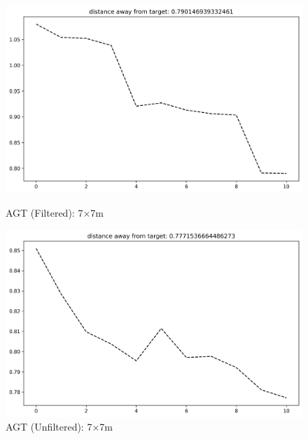 \documentclass[runningheads]{llncs}
\begin{document}
\begin{figure}[H]
	\centering
	\begin{minipage}{0.49\textwidth}
		\centering
		\includegraphics[width=\textwidth]{figures/filtered/svm_custom_7.png}
		\caption*{AGT (Filtered): 7×7m}
	\end{minipage}
	\hfill
	\begin{minipage}{0.49\textwidth}
		\centering
		\includegraphics[width=\textwidth]{figures/unfiltered/svm_custom_7.png}
		\caption*{AGT (Unfiltered): 7×7m}
	\end{minipage}
\end{figure}
\end{document}
